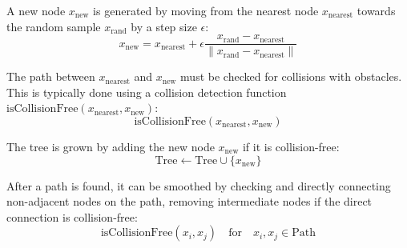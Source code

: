 \documentclass{ieeeaccess}
\begin{document}
A new node \( x_{\text{new}} \) is generated by moving from the nearest node \( x_{\text{nearest}} \) towards the random sample \( x_{\text{rand}} \) by a step size \( \epsilon \):
\begin{equation}
x_{\text{new}} = x_{\text{nearest}} + \epsilon \frac{x_{\text{rand}} - x_{\text{nearest}}}{\| x_{\text{rand}} - x_{\text{nearest}} \|}
\end{equation}

The path between \( x_{\text{nearest}} \) and \( x_{\text{new}} \) must be checked for collisions with obstacles. This is typically done using a collision detection function \( \text{isCollisionFree}(x_{\text{nearest}}, x_{\text{new}}) \):
\begin{equation}
\text{isCollisionFree}(x_{\text{nearest}}, x_{\text{new}})
\end{equation}

The tree is grown by adding the new node \( x_{\text{new}} \) if it is collision-free:
\begin{equation}
\text{Tree} \leftarrow \text{Tree} \cup \{x_{\text{new}}\}
\end{equation}

After a path is found, it can be smoothed by checking and directly connecting non-adjacent nodes on the path, removing intermediate nodes if the direct connection is collision-free:
\begin{equation}
\text{isCollisionFree}(x_i, x_j) \quad \text{for} \quad x_i, x_j \in \text{Path}
\end{equation}
\end{document}
